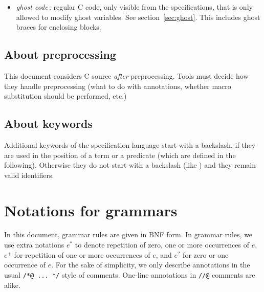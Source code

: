 \begin{itemize}
\begin{itemize}
  \item \emph{ghost code}\,: regular C code, only visible from the
    specifications, that is only allowed to modify ghost
    variables. See section~\ref{sec:ghost}. This includes ghost braces
    for enclosing blocks.

  \end{itemize}


\end{itemize}



\subsection{About preprocessing}

This document considers C source \emph{after} preprocessing.
Tools must decide how they handle preprocessing (what to do with
annotations, whether macro substitution should be performed, etc.)

\subsection{About keywords}

Additional keywords of the specification language start with a
backslash, if they are used in the position of a term or a predicate
(which are defined in the following).  Otherwise they do not start
with a backslash (like \ensures{}) and they remain valid identifiers.
\section{Notations for grammars}

In this document, grammar rules are given in BNF form. In grammar
rules, we use extra notations $e^*$ to denote repetition of zero, one
or more occurrences of $e$, $e^+$ for repetition of one or more
occurrences of $e$, and $e^?$ for zero or one occurrence of $e$.  For
the sake of simplicity, we only describe annotations in the usual
\lstinline|/*@ ... */| style of comments. One-line annotations
in \lstinline|//@| comments are alike.


